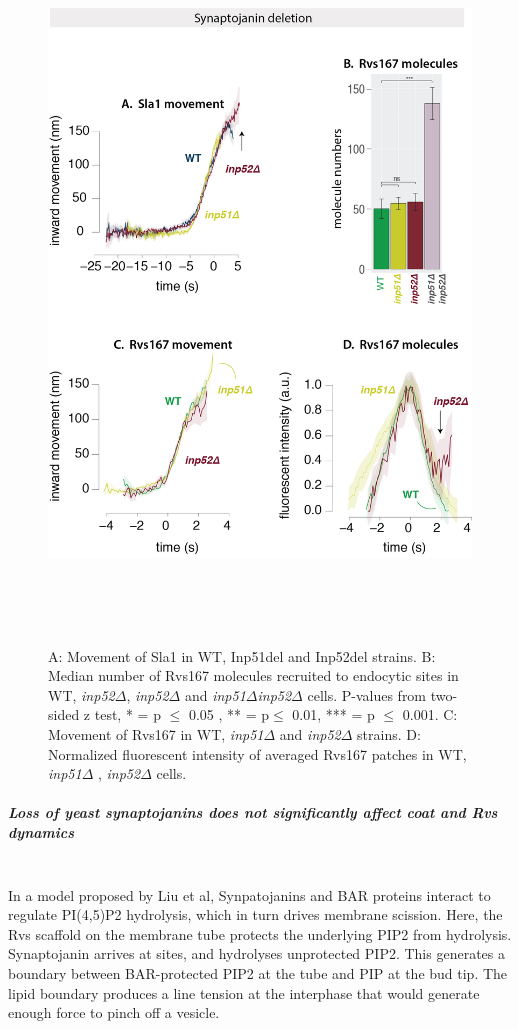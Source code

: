 			\begin{figure}
			\centering
			\includegraphics[width=19cm,height=19cm,keepaspectratio]{figures/results_final/inp_movement3}
			\caption[Synaptojanin deletion]
			{A: Movement of Sla1 in WT, Inp51del and Inp52del strains. 
			B: Median number of Rvs167 molecules recruited to endocytic sites in WT, \textit{inp52$\Delta$}, \textit{inp52$\Delta$ } and \textit{inp51$\Delta$inp52$\Delta$ } cells. P-values from two-sided z test,  * = p $\leq$ 0.05 , ** = p$\leq$ 0.01, *** = p $\leq$ 0.001.  
			C: Movement of Rvs167 in WT, \textit{inp51$\Delta$ } and \textit{inp52$\Delta$ } strains. 
			D: Normalized fluorescent intensity of averaged Rvs167 patches in WT, \textit{inp51$\Delta$ }, \textit{inp52$\Delta$ } cells.
			\label{fig_inpmov}}
			\end{figure}

		\subparagraph{Loss of yeast synaptojanins does not significantly affect coat and Rvs dynamics}
		\mbox{}\\
		In a model proposed by Liu et al, Synpatojanins and BAR proteins interact to regulate PI(4,5)P2 hydrolysis, which in turn drives membrane scission. Here, the Rvs scaffold on the membrane tube protects the underlying PIP2 from hydrolysis. Synaptojanin arrives at sites, and hydrolyses unprotected PIP2. This generates a boundary between BAR-protected PIP2 at the tube and PIP at the bud tip. The lipid boundary produces a line tension at the interphase that would generate enough force to pinch off a vesicle. 


